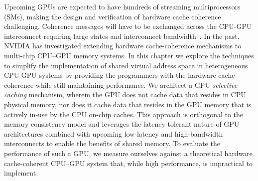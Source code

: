 Upcoming GPUs are expected to have hundreds of streaming multiprocessors (SMs),
making the design and verification of hardware cache coherence challenging.
Coherence messages will have to be exchanged across the CPU-GPU interconnect
requiring large states and interconnect bandwidth~\cite{Kelm2010,johnson2011}.
In the past, NVIDIA has investigated extending hardware cache-coherence
mechanisms to multi-chip CPU--GPU memory systems. In this chapter we explore the
techniques to simplify the implementation of shared virtual address space in
heterogeneous CPU-GPU systems by providing the programmers with the hardware
cache coherence while still maintaining performance. We architect a GPU
\textit{selective caching} mechanism, wherein
the GPU does not cache data that resides in CPU physical memory, nor does it
cache data that resides in the GPU memory that is actively in-use by the CPU
on-chip caches. This approach is orthogonal to the memory consistency model and
leverages the latency tolerant nature of GPU architectures combined with
upcoming low-latency and high-bandwidth interconnects to enable the benefits of
shared memory.  To evaluate the performance of such a GPU, we measure ourselves
against a theoretical hardware cache-coherent CPU--GPU system that, while high
performance, is impractical to implement.

